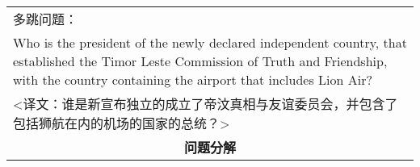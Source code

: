 \begin{table}[htbp]
\begin{tabular}{p{420pt}}
    \hline
    多跳问题： \\
    Who is the president of the newly declared independent country, that established the Timor Leste Commission of Truth and Friendship, with the country containing the airport that includes Lion Air? \\
    <译文：谁是新宣布独立的成立了帝汶真相与友谊委员会，并包含了包括狮航在内的机场的国家的总统？> \\
    \hline
    \multicolumn{1}{c}{\bfseries 问题分解} \\

\end{tabular}
\end{table}
